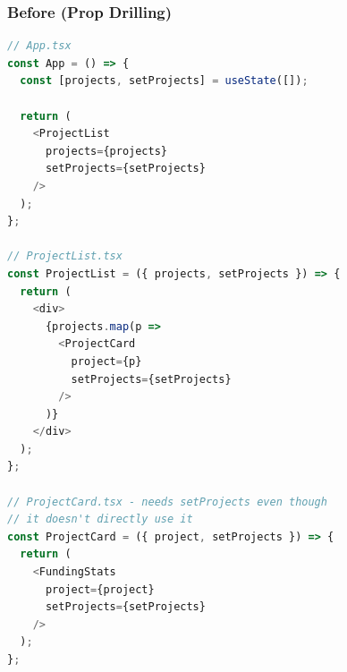 \documentclass[12pt,a4paper]{article}
\begin{document}
\subsubsection{Before (Prop Drilling)}
\begin{lstlisting}[language=JavaScript, caption=Original prop drilling]
// App.tsx
const App = () => {
  const [projects, setProjects] = useState([]);
  
  return (
    <ProjectList 
      projects={projects} 
      setProjects={setProjects} 
    />
  );
};

// ProjectList.tsx
const ProjectList = ({ projects, setProjects }) => {
  return (
    <div>
      {projects.map(p => 
        <ProjectCard 
          project={p} 
          setProjects={setProjects} 
        />
      )}
    </div>
  );
};

// ProjectCard.tsx - needs setProjects even though 
// it doesn't directly use it
const ProjectCard = ({ project, setProjects }) => {
  return (
    <FundingStats 
      project={project} 
      setProjects={setProjects} 
    />
  );
};
\end{lstlisting}
\end{document}
